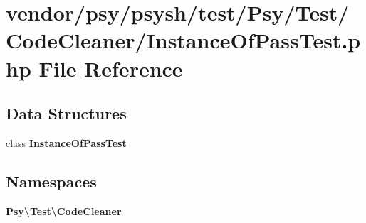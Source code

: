 \section{vendor/psy/psysh/test/\+Psy/\+Test/\+Code\+Cleaner/\+Instance\+Of\+Pass\+Test.php File Reference}
\label{_instance_of_pass_test_8php}
\subsection*{Data Structures}
\begin{DoxyCompactItemize}
\item 
class {\bf Instance\+Of\+Pass\+Test}
\end{DoxyCompactItemize}
\subsection*{Namespaces}
\begin{DoxyCompactItemize}
\item 
 {\bf Psy\textbackslash{}\+Test\textbackslash{}\+Code\+Cleaner}
\end{DoxyCompactItemize}
